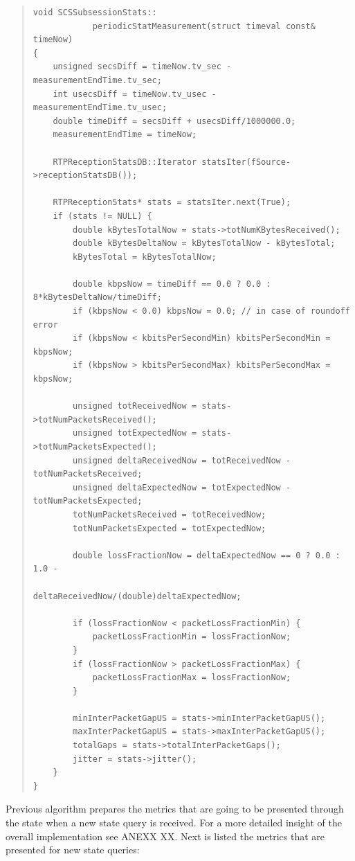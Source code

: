 \begin{quote}
\begin{verbatim}
void SCSSubsessionStats::
			periodicStatMeasurement(struct timeval const& timeNow) 
{
    unsigned secsDiff = timeNow.tv_sec - measurementEndTime.tv_sec;
    int usecsDiff = timeNow.tv_usec - measurementEndTime.tv_usec;
    double timeDiff = secsDiff + usecsDiff/1000000.0;
    measurementEndTime = timeNow;

    RTPReceptionStatsDB::Iterator statsIter(fSource->receptionStatsDB());

    RTPReceptionStats* stats = statsIter.next(True);
    if (stats != NULL) {
        double kBytesTotalNow = stats->totNumKBytesReceived();
        double kBytesDeltaNow = kBytesTotalNow - kBytesTotal;
        kBytesTotal = kBytesTotalNow;

        double kbpsNow = timeDiff == 0.0 ? 0.0 : 8*kBytesDeltaNow/timeDiff;
        if (kbpsNow < 0.0) kbpsNow = 0.0; // in case of roundoff error
        if (kbpsNow < kbitsPerSecondMin) kbitsPerSecondMin = kbpsNow;
        if (kbpsNow > kbitsPerSecondMax) kbitsPerSecondMax = kbpsNow;

        unsigned totReceivedNow = stats->totNumPacketsReceived();
        unsigned totExpectedNow = stats->totNumPacketsExpected();
        unsigned deltaReceivedNow = totReceivedNow - totNumPacketsReceived;
        unsigned deltaExpectedNow = totExpectedNow - totNumPacketsExpected;
        totNumPacketsReceived = totReceivedNow;
        totNumPacketsExpected = totExpectedNow;

        double lossFractionNow = deltaExpectedNow == 0 ? 0.0 : 1.0 -
        							 deltaReceivedNow/(double)deltaExpectedNow;

        if (lossFractionNow < packetLossFractionMin) {
            packetLossFractionMin = lossFractionNow;
        }
        if (lossFractionNow > packetLossFractionMax) {
            packetLossFractionMax = lossFractionNow;
        }

        minInterPacketGapUS = stats->minInterPacketGapUS();
        maxInterPacketGapUS = stats->maxInterPacketGapUS();
        totalGaps = stats->totalInterPacketGaps();
        jitter = stats->jitter();
    }
}
\end{verbatim}
\end{quote} 

Previous algorithm prepares the metrics that are going to be presented through the state when a new state query is received. For a more detailed insight of the overall implementation see ANEXX XX. Next is listed the metrics that are presented for new state queries:

